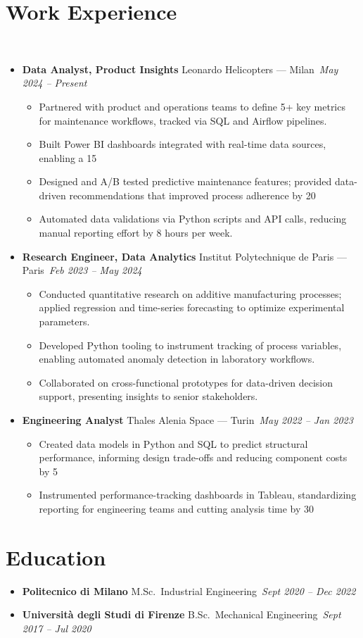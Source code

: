 \documentclass[letterpaper,10.5pt]{article}
\newcommand{\resumeEntry}[4]{
\item\textbf{#1} \hfill #2\
\textit{#3} \hfill \textit{#4}
}
\newcommand{\resumeDescription}[1]{
\vspace{-3pt}\begin{itemize}[leftmargin=0.2in]
#1
\end{itemize}
}
\begin{document}
\section*{Work Experience}\\
\begin{itemize}[leftmargin=0.2in]
\resumeEntry{Data Analyst, Product Insights}{Leonardo Helicopters — Milan}{May 2024 -- Present}{}
\resumeDescription{
\item Partnered with product and operations teams to define 5+ key metrics for maintenance workflows, tracked via SQL and Airflow pipelines.
\item Built Power BI dashboards integrated with real-time data sources, enabling a 15%
\item Designed and A/B tested predictive maintenance features; provided data-driven recommendations that improved process adherence by 20%
\item Automated data validations via Python scripts and API calls, reducing manual reporting effort by 8 hours per week.
}
\resumeEntry{Research Engineer, Data Analytics}{Institut Polytechnique de Paris — Paris}{Feb 2023 -- May 2024}{}
\resumeDescription{
    \item Conducted quantitative research on additive manufacturing processes; applied regression and time-series forecasting to optimize experimental parameters.
    \item Developed Python tooling to instrument tracking of process variables, enabling automated anomaly detection in laboratory workflows.
    \item Collaborated on cross-functional prototypes for data-driven decision support, presenting insights to senior stakeholders.
}

\resumeEntry{Engineering Analyst}{Thales Alenia Space — Turin}{May 2022 -- Jan 2023}{}
\resumeDescription{
    \item Created data models in Python and SQL to predict structural performance, informing design trade-offs and reducing component costs by 5%
    \item Instrumented performance-tracking dashboards in Tableau, standardizing reporting for engineering teams and cutting analysis time by 30%
}
\end{itemize}

\section*{Education}
\begin{itemize}[leftmargin=0.2in]
\resumeEntry{Politecnico di Milano}{M.Sc.\ Industrial Engineering}{Sept 2020 -- Dec 2022}{}
\resumeEntry{Università degli Studi di Firenze}{B.Sc.\ Mechanical Engineering}{Sept 2017 -- Jul 2020}{}
\end{itemize}
\end{document}
